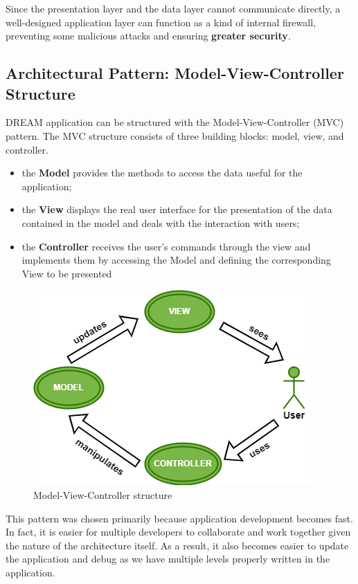 Since the presentation layer and the data layer cannot communicate directly, a well-designed application layer can function as a kind of internal firewall, preventing some malicious attacks and ensuring \textbf{greater security}.

\subsection{Architectural Pattern: Model-View-Controller Structure}
DREAM application can be structured with the Model-View-Controller (MVC) pattern.
The MVC structure consists of three building blocks: model, view, and controller.
\begin{itemize}
    \item the \textbf{Model} provides the methods to access the data useful for the application;
    \item the \textbf{View} displays the real user interface for the presentation of the data contained in the model and deals with the interaction with users;
    \item the \textbf{Controller} receives the user's commands through the view and implements them by accessing the Model and defining the corresponding View to be presented
\end{itemize}

\begin{figure}[H]
  \centering
  \includegraphics[scale=0.7]{./Images/MVC.png}
  \caption{Model-View-Controller structure}
\end{figure}

This pattern was chosen primarily because application development becomes fast. In fact, it is easier for multiple developers to collaborate and work together given the nature of the architecture itself.
As a result, it also becomes easier to update the application and debug as we have multiple levels properly written in the application.
